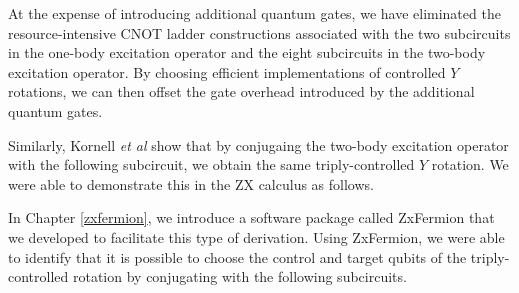 At the expense of introducing additional quantum gates, we have eliminated the resource-intensive CNOT ladder constructions associated with the two subcircuits in the one-body excitation operator and the eight subcircuits in the two-body excitation operator. By choosing efficient implementations of controlled $Y$ rotations, we can then offset the gate overhead introduced by the additional quantum gates.

Similarly, Kornell \textit{et al} \cite{Kornell2023} show that by conjugaing the two-body excitation operator with the following subcircuit, we obtain the same triply-controlled $Y$ rotation. We were able to demonstrate this in the ZX calculus as follows.


In Chapter \ref{zxfermion}, we introduce a software package called ZxFermion that we developed to facilitate this type of derivation. Using ZxFermion, we were able to identify that it is possible to choose the control and target qubits of the triply-controlled rotation by conjugating with the following subcircuits.



